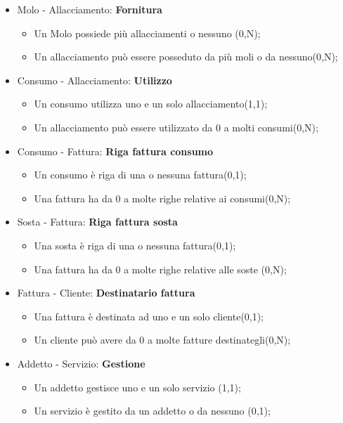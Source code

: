 \begin{itemize}
    
    \item Molo - Allacciamento: \textbf{Fornitura}
    \begin{itemize}
        \item Un Molo possiede più allacciamenti o nessuno (0,N);
        \item Un allacciamento può essere posseduto da più moli o da nessuno(0,N);
    \end{itemize}

    \item Consumo - Allacciamento: \textbf{Utilizzo}
    \begin{itemize}
        \item Un consumo utilizza uno e un solo allacciamento(1,1);
        \item Un allacciamento può essere utilizzato da 0 a molti consumi(0,N);
    \end{itemize}

    \item Consumo - Fattura: \textbf{Riga fattura consumo}
    \begin{itemize}
        \item Un consumo è riga di una o nessuna fattura(0,1);
        \item Una fattura ha da 0 a molte righe relative ai consumi(0,N);
    \end{itemize}

    \item Sosta - Fattura: \textbf{Riga fattura sosta}
    \begin{itemize}
        \item Una sosta è riga di una o nessuna fattura(0,1);
        \item Una fattura ha da 0 a molte righe relative alle soste (0,N);
    \end{itemize}

    \item Fattura - Cliente: \textbf{Destinatario fattura}
    \begin{itemize}
        \item Una fattura è destinata ad uno e un solo cliente(0,1);
        \item Un cliente può avere da 0 a molte fatture destinategli(0,N);
    \end{itemize}

    \item Addetto - Servizio: \textbf{Gestione}
    \begin{itemize}
        \item Un addetto gestisce uno e un solo servizio (1,1);
        \item Un servizio è gestito da un addetto o da nessuno (0,1);
    \end{itemize}


\end{itemize}
